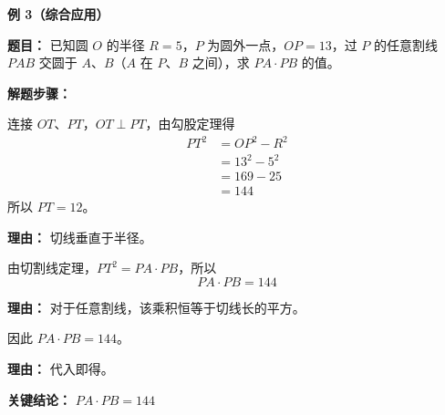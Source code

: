 \begin{examplebox}
	\medskip
	\textbf{\textcolor{CExample}{例 3（综合应用）}}

	\textbf{\textcolor{CExample}{题目：}}
	已知圆 $O$ 的半径 $R=5$，$P$ 为圆外一点，$OP=13$，过 $P$ 的任意割线 $PAB$ 交圆于 $A$、$B$（$A$ 在 $P$、$B$ 之间），求 $PA\cdot PB$ 的值。

	\textbf{\textcolor{CExample}{解题步骤：}}
	\begin{description}[style=nextline, leftmargin=2.8em, labelsep=0.5em, itemsep=0.45em]
		\item[\textbf{第一步（求切线长）：}] 连接 $OT$、$PT$，$OT\perp PT$，由勾股定理得
			\[
				\begin{aligned}
					PT^{2} &= OP^{2} - R^{2} \\
					&= 13^{2} - 5^{2} \\
					&= 169 - 25 \\
					&= 144
			\end{aligned}
			\]
			所以 $PT=12$。
			\par\textbf{理由：}
			切线垂直于半径。
		\item[\textbf{第二步（应用定理）：}] 由切割线定理，$PT^{2}=PA\cdot PB$，所以
			\[
				PA\cdot PB = 144
			\]
			\par\textbf{理由：}
			对于任意割线，该乘积恒等于切线长的平方。
		\item[\textbf{第三步（结论）：}] 因此 $PA\cdot PB=144$。
			\par\textbf{理由：}
			代入即得。
	\end{description}

	\textbf{\textcolor{CExample}{关键结论：}}
	\textbf{$PA\cdot PB=144$}
\end{examplebox}
